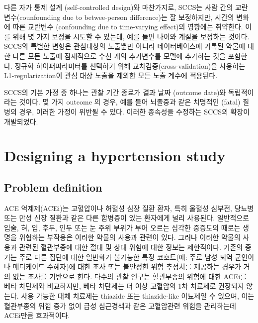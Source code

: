 \documentclass[]{book}
\begin{document}
다른 자가 통제 설계 (self-controlled design)와 마찬가지로, SCCS는 사람 간의 교란 변수(counfounding due to betwee-person difference)는 잘 보정하지만, 시간의 변화에 따른 교란변수 (confounding due to time-varying effect)의 영향에는 취약한다. 이를 위해 몇 가지 보정을 시도할 수 있는데, 예를 들면 나이와 계절을 보정하는 것이다. SCCS의 특별한 변형은 관심대상의 노출뿐만 아니라 데이터베이스에 기록된 약물에 대한 다른 모든 노출\citep{simpson_2013}에 잠재적으로 수천 개의 추가변수를 모델에 추가하는 것을 포함한다. 정규화 하이퍼파라미터를 선택하기 위해 교차검증(cross-validation)을 사용하는 L1-regularization이 관심 대상 노출을 제외한 모든 노출 계수에 적용된다.

SCCS의 기본 가정 중 하나는 관찰 기간 종료가 결과 날짜 (outcome date)와 독립적이라는 것이다. 몇 가지 outcome 의 경우, 예를 들어 뇌졸중과 같은 치명적인 (fatal) 질병의 경우, 이러한 가정이 위반될 수 있다. 이러한 종속성을 수정하는 SCCS의 확장이 개발되었다.\citep{farrington_2011}

\hypertarget{designing-a-hypertension-study}{%
\section{Designing a hypertension study}\label{designing-a-hypertension-study}}

\hypertarget{problem-definition}{%
\subsection{Problem definition}\label{problem-definition}}

ACE 억제제(ACEi)는 고혈압이나 허혈성 심장 질환 환자, 특히 울혈성 심부전, 당뇨병 또는 만성 신장 질환과 같은 다른 합병증이 있는 환자에게 널리 사용된다. \citep{zaman_2002} 일반적으로 입술, 혀, 입, 후두, 인두 또는 눈 주위 부위가 부어 오르는 심각한 중증도의 때로는 생명을 위협하는 부작용은 이러한 약물의 사용과 관련이 있다. \citep{sabroe_1997} 그러나 이러한 약물의 사용과 관련된 혈관부종에 대한 절대 및 상대 위험에 대한 정보는 제한적이다. 기존의 증거는 주로 다른 집단에 대한 일반화가 불가능한 특정 코호트(예: 주로 남성 퇴역 군인이나 메디케이드 수혜자)에 대한 조사 또는 불안정한 위험 추정치를 제공하는 경우가 거의 없는 조사를 기반으로 한다. \citep{powers_2012} 다수의 관찰 연구는 혈관부종의 위험에 대한 ACEi를 베타 차단제와 비교하지만\citep{magid_2010, toh_2012}, 베타 차단제는 더 이상 고혈압의 1차 치료제로 권장되지 않는다.\citep{whelton_2018} 사용 가능한 대체 치료제는 thiazide 또는 thiazide-like 이뇨제일 수 있으며, 이는 혈관부종의 위험 증가 없이 급성 심근경색과 같은 고혈압관련 위험을 관리하는데 ACEi만큼 효과적이다.
\end{document}
